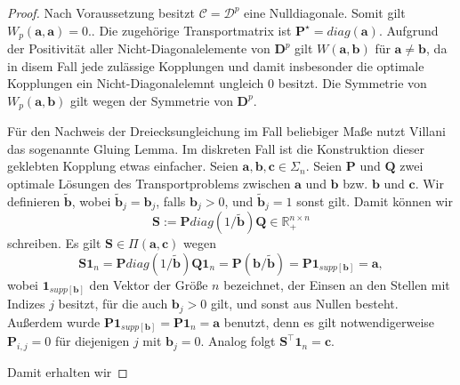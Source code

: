 \documentclass[11pt,a4paper]{article}
\numberwithin{equation}{section}
\begin{document}
	\begin{proof}
		Nach Voraussetzung besitzt $\mathcal{C} = \mathcal{D}^p$ eine Nulldiagonale. Somit gilt $W_p(\boldsymbol{a},\boldsymbol{a}) =0.$. Die zugehörige Transportmatrix ist $\boldsymbol{P}^\star = diag(\boldsymbol{a})$. Aufgrund der Positivität aller Nicht-Diagonalelemente von $\boldsymbol{D}^p$ gilt $W(\boldsymbol{a},\boldsymbol{b})$ für $\boldsymbol{a} \neq \boldsymbol{b}$, da in disem Fall jede zulässige Kopplungen und damit insbesonder die optimale Kopplungen ein Nicht-Diagonalelemnt ungleich $0$ besitzt. Die Symmetrie von $W_p(\boldsymbol{a},\boldsymbol{b})$ gilt wegen der Symmetrie von $\boldsymbol{D}^p$.
		
	 	Für den Nachweis der Dreiecksungleichung im Fall beliebiger Maße nutzt Villani \cite{villani2003topics} das sogenannte Gluing Lemma. Im diskreten Fall ist die Konstruktion dieser geklebten Kopplung etwas einfacher. Seien $\boldsymbol{a}, \boldsymbol{b}, \boldsymbol{c} \in \Sigma_n$. Seien $\boldsymbol{P}$ und $\boldsymbol{Q}$ zwei optimale Lösungen des Transportproblems zwischen $\boldsymbol{a}$ und $\boldsymbol{b}$ bzw. $\boldsymbol{b}$ und $\boldsymbol{c}$.
	 	Wir definieren $\tilde{\boldsymbol{b}}$, wobei $\tilde{\boldsymbol{b}}_j = \boldsymbol{b}_j$, falls $\boldsymbol{b}_j > 0$, und $\tilde{\boldsymbol{b}}_j = 1$ sonst gilt. Damit können wir 
	 	\begin{equation}
	 		\boldsymbol{S}:= \boldsymbol{P} diag(1/\tilde{\boldsymbol{b}})\boldsymbol{Q} \in \mathbb{R}_+^{n\times n}
	 	\end{equation}
	 	schreiben. Es gilt $\boldsymbol{S} \in \Pi (\boldsymbol{a}, \boldsymbol{c})$ wegen
	 	\begin{equation}
	 	\boldsymbol{S}\boldsymbol{1}_n = \boldsymbol{P} diag(1/\tilde{\boldsymbol{b}})\boldsymbol{Q}\boldsymbol{1}_n = \boldsymbol{P}(\boldsymbol{b}/\tilde{\boldsymbol{b}}) = \boldsymbol{P}\boldsymbol{1}_{supp[\boldsymbol{b}]} = \boldsymbol{a},	 	\end{equation}
	 	wobei $\boldsymbol{1}_{supp[\boldsymbol{b}]}$ den Vektor der Größe $n$ bezeichnet, der Einsen an den Stellen mit Indizes $j$ besitzt, für die auch $\boldsymbol{b}_j >0$ gilt, und sonst aus Nullen besteht.
	 	Außerdem wurde $\boldsymbol{P}\boldsymbol{1}_{supp[\boldsymbol{b}]} = \boldsymbol{P}\boldsymbol{1}_n = \boldsymbol{a}$ benutzt, denn es gilt notwendigerweise $\boldsymbol{P}_{i,j} = 0$ für diejenigen $j$ mit $\boldsymbol{b}_j = 0$. Analog folgt $\boldsymbol{S}^\top\boldsymbol{1}_n = \boldsymbol{c}$.
	 	
	 	Damit erhalten wir
	 	

\end{proof}
\end{document}
